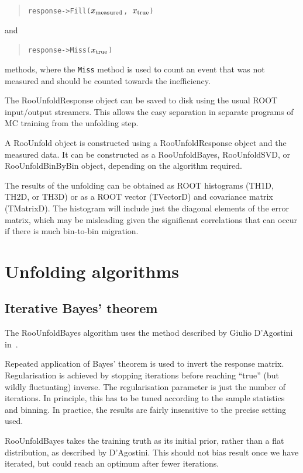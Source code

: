 \documentclass{desyproc}
\begin{document}
\begin{quote}
\texttt{response->Fill($x_{\rm measured}$, $x_{\rm true}$)}
\end{quote}

and

\begin{quote}
\texttt{response->Miss($x_{\rm true}$)}
\end{quote}

methods, where the \texttt{Miss} method is used to count an event that was not measured
and should be counted towards the inefficiency.

The RooUnfoldResponse object can be saved to disk using the usual ROOT input/output
streamers. This allows the easy separation in separate programs
of MC training from the unfolding step.

A RooUnfold object is constructed using a RooUnfoldResponse object and the measured
data. It can be constructed as a RooUnfoldBayes, RooUnfoldSVD, or RooUnfoldBinByBin
object, depending on the algorithm required.

The results of the unfolding can be obtained as ROOT histograms (TH1D, TH2D, or TH3D)
or as a ROOT vector (TVectorD) and covariance matrix (TMatrixD). The histogram will
include just the diagonal elements of the error matrix, which may be misleading
given the significant correlations that can occur if there is much bin-to-bin migration.

\section{Unfolding algorithms}

\subsection{Iterative Bayes' theorem}

The RooUnfoldBayes algorithm uses the method described by Giulio D'Agostini in~\cite{D'Agostini:1994zf}.

Repeated application of Bayes' theorem is used to invert the response matrix.
Regularisation is achieved by stopping iterations before reaching ``true''
(but wildly fluctuating) inverse.
The regularisation parameter is just the number of iterations.
In principle, this has to be tuned according to the sample statistics and binning.
In practice, the results are fairly insensitive to the precise setting used.

RooUnfoldBayes takes the training truth as its initial prior, rather than a flat distribution,
as described by D'Agostini.
This should not bias result once we have iterated, but could reach an optimum after fewer iterations.
\end{document}
